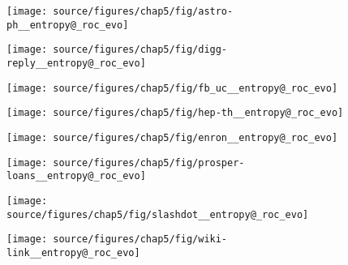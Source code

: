 

\begin{subfigure}
     \centering
         \texttt{[image: source/figures/chap5/fig/astro-ph\_\_entropy@\_roc\_evo]}
\end{subfigure}
\begin{subfigure}
         \centering
      \texttt{[image: source/figures/chap5/fig/digg-reply\_\_entropy@\_roc\_evo]}               
\end{subfigure}                                                                          
\begin{subfigure}                                                                        
         \centering                                                                      
      \texttt{[image: source/figures/chap5/fig/fb\_uc\_\_entropy@\_roc\_evo]}
\end{subfigure}                                                                          
\begin{subfigure}                                                                        
         \centering                                                                      
      \texttt{[image: source/figures/chap5/fig/hep-th\_\_entropy@\_roc\_evo]}
\end{subfigure}                                                                          
\begin{subfigure}                                                                        
     \centering                                                                          
         \texttt{[image: source/figures/chap5/fig/enron\_\_entropy@\_roc\_evo]}
\end{subfigure}
\begin{subfigure}
         \centering
      \texttt{[image: source/figures/chap5/fig/prosper-loans\_\_entropy@\_roc\_evo]}
\end{subfigure}                                                             
\begin{subfigure}                                                           
         \centering                                                         
      \texttt{[image: source/figures/chap5/fig/slashdot\_\_entropy@\_roc\_evo]}
\end{subfigure}                                                             
\begin{subfigure}                                                           
         \centering                                                         
      \texttt{[image: source/figures/chap5/fig/wiki-link\_\_entropy@\_roc\_evo]}
\end{subfigure}                                                             
